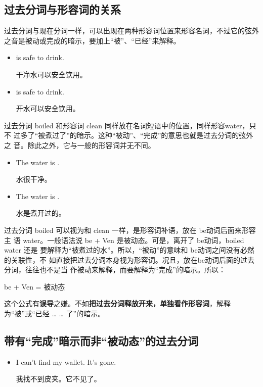 \subsection{过去分词与形容词的关系}

过去分词与现在分词一样，可以出现在两种形容词位置来形容名词，不过它的弦外之音是被动或完成的暗示，要加上“被”、“已经”来解释。

\begin{itemize}
\item {} is safe to drink.

干净水可以安全饮用。
\item {} is safe to drink.

开水可以安全饮用。
\end{itemize}

过去分词 boiled 和形容词 clean 同样放在名词短语中的位置，同样形容water，只不
过多了“被煮过了”的暗示。这种“被动”、“完成”的意思也就是过去分词的弦外之
音。除此之外，它与一般的形容词并无不同。

\begin{itemize}
\item The water is .

水很干净。
\item The water is .

水是煮开过的。
\end{itemize}

过去分词 boiled 可以视为和 clean 一样，是形容词补语，放在 be动词后面来形容主
语 water。一般语法说 be + Ven 是被动态。可是，离开了 be动词，boiled water 还是
要解释为“被煮过的水”。所以，“被动”的意味和 be动词之间没有必然的关联性，不
如直接把过去分词本身视为形容词。况且，放在be动词后面的过去分词，往往也不是当
作被动来解释，而要解释为“完成”的暗示。所以：

be + Ven = 被动态

这个公式有\textbf{误导}之嫌。不如\textbf{把过去分词释放开来，单独看作形容词}，解释为“被”或“已经 \ldots{} \ldots{} 了”的暗示。

\subsection{带有“完成”暗示而非“被动态”的过去分词}

\begin{itemize}
\item  I can't find my wallet. It's gone.

  我找不到皮夹。它不见了。
\end{itemize}

